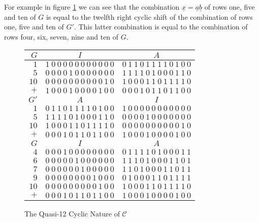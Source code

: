For example in figure \ref{fig:quasicyclic} we can see that the combination $\underline{x}=\underline{a}\underline{b}$ of rows one, five and ten of $G$ is equal to the twelfth right cyclic shift of the combination of rows one, five and ten of $G'$.
This latter combination is equal to the combination of rows four, six, seven, nine and ten of $G$.
\begin{figure}
\begin{center}
\begin{tabular}{|r|c|c|}
	\hline
	$G$ & $I$ & $A$ \\
	\hline
	 $1$ & $1\ 0\ 0\ 0\ 0\ 0\ 0\ 0\ 0\ 0\ 0\ 0$ & $0\ 1\ 1\ 0\ 1\ 1\ 1\ 1\ 0\ 1\ 0\ 0$ \\
	 $5$ & $0\ 0\ 0\ 0\ 1\ 0\ 0\ 0\ 0\ 0\ 0\ 0$ & $1\ 1\ 1\ 1\ 0\ 1\ 0\ 0\ 0\ 1\ 1\ 0$ \\
	$10$ & $0\ 0\ 0\ 0\ 0\ 0\ 0\ 0\ 0\ 0\ 1\ 0$ & $1\ 0\ 0\ 0\ 1\ 1\ 0\ 1\ 1\ 1\ 1\ 0$ \\								
	\hline
\rowcolor[rgb]{0.8,0.8,0.8} $+$ & $1\ 0\ 0\ 0\ 1\ 0\ 0\ 0\ 0\ 1\ 0\ 0$ & $0\ 0\ 0\ 1\ 0\ 1\ 1\ 0\ 1\ 1\ 0\ 0$ \\
	\hline
	\hline
	$G'$ & $A$ & $I$ \\
	\hline
	 $1$ & $0\ 1\ 1\ 0\ 1\ 1\ 1\ 1\ 0\ 1\ 0\ 0$ & $1\ 0\ 0\ 0\ 0\ 0\ 0\ 0\ 0\ 0\ 0\ 0$ \\
	 $5$ & $1\ 1\ 1\ 1\ 0\ 1\ 0\ 0\ 0\ 1\ 1\ 0$ & $0\ 0\ 0\ 0\ 1\ 0\ 0\ 0\ 0\ 0\ 0\ 0$ \\
	$10$ & $1\ 0\ 0\ 0\ 1\ 1\ 0\ 1\ 1\ 1\ 1\ 0$ & $0\ 0\ 0\ 0\ 0\ 0\ 0\ 0\ 0\ 0\ 1\ 0$ \\								
	\hline
	\rowcolor[rgb]{0.8,0.8,0.8} $+$ & $0\ 0\ 0\ 1\ 0\ 1\ 1\ 0\ 1\ 1\ 0\ 0$ & $1\ 0\ 0\ 0\ 1\ 0\ 0\ 0\ 0\ 1\ 0\ 0$ \\
	\hline
	\hline
	$G$ & $I$ & $A$ \\
	\hline
	 $4$ & $0\ 0\ 0\ 1\ 0\ 0\ 0\ 0\ 0\ 0\ 0\ 0$ & $0\ 1\ 1\ 1\ 1\ 0\ 1\ 0\ 0\ 0\ 1\ 1$ \\
	 $6$ & $0\ 0\ 0\ 0\ 0\ 1\ 0\ 0\ 0\ 0\ 0\ 0$ & $1\ 1\ 1\ 0\ 1\ 0\ 0\ 0\ 1\ 1\ 0\ 1$ \\
	 $7$ & $0\ 0\ 0\ 0\ 0\ 0\ 1\ 0\ 0\ 0\ 0\ 0$ & $1\ 1\ 0\ 1\ 0\ 0\ 0\ 1\ 1\ 0\ 1\ 1$ \\							
	 $9$ & $0\ 0\ 0\ 0\ 0\ 0\ 0\ 0\ 1\ 0\ 0\ 0$ & $0\ 1\ 0\ 0\ 0\ 1\ 1\ 0\ 1\ 1\ 1\ 1$ \\								
	$10$ & $0\ 0\ 0\ 0\ 0\ 0\ 0\ 0\ 0\ 1\ 0\ 0$ & $1\ 0\ 0\ 0\ 1\ 1\ 0\ 1\ 1\ 1\ 1\ 0$ \\						
	\hline
	\rowcolor[rgb]{0.8,0.8,0.8} $+$ & $0\ 0\ 0\ 1\ 0\ 1\ 1\ 0\ 1\ 1\ 0\ 0$ & $1\ 0\ 0\ 0\ 1\ 0\ 0\ 0\ 0\ 1\ 0\ 0$ \\
	\hline
\end{tabular}
\caption{The Quasi-12 Cyclic Nature of $\mathcal{C}$}
\label{fig:quasicyclic}
\end{center}
\end{figure}


